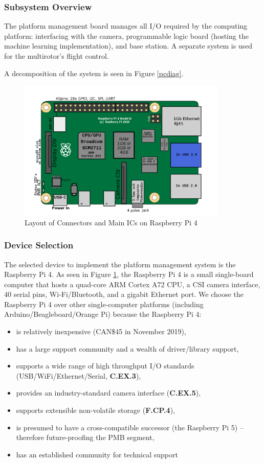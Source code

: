 \subsubsection{Subsystem Overview}
The platform management board manages all I/O required by the computing platform: interfacing with the camera, programmable logic board (hosting the machine learning implementation), and base station. A separate system is used for the multirotor's flight control.

A decomposition of the system is seen in Figure \ref{pcdiag}.

\begin{figure}[H]
\centering
\includegraphics[width=10cm]{img/RaspberryPi_Model_4B.png}
\caption[Layout of Connectors and Main ICs on Raspberry Pi 4]{Layout of Connectors and Main ICs on Raspberry Pi 4\cite{rpidiag}}
\label{rpi}
\end{figure}

\subsubsection{Device Selection}
The selected device to implement the platform management system is the Raspberry Pi 4. As seen in Figure \ref{rpi}, the Raspberry Pi 4 is a small single-board computer that hosts a quad-core ARM Cortex A72 CPU, a CSI camera interface, 40 serial pins, Wi-Fi/Bluetooth, and a gigabit Ethernet port. We choose the Raspberry Pi 4 over other single-computer platforms (including Arduino/Beagleboard/Orange Pi) because the Raspberry Pi 4:
\begin{itemize}
\item is relatively inexpensive (CAN\$45 in November 2019),
\item has a large support community and a wealth of driver/library support,
\item supports a wide range of high throughput I/O standards (USB/WiFi/Ethernet/Serial, \textbf{C.EX.3}),
\item provides an industry-standard camera interface (\textbf{C.EX.5}),
\item supports extensible non-volatile storage (\textbf{F.CP.4}),
\item is presumed to have a cross-compatible successor (the Raspberry Pi 5) -- therefore future-proofing the PMB segment,
\item has an established community for technical support
\end{itemize} 


